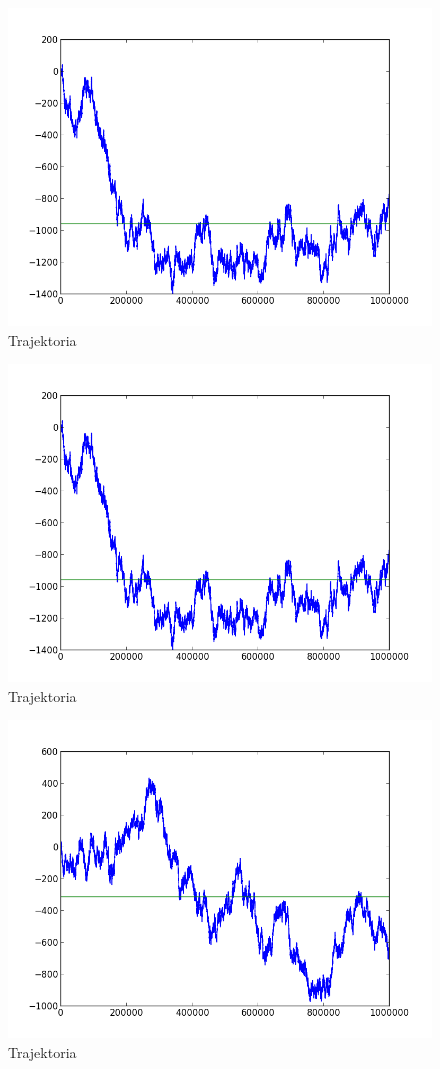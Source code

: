 \documentclass[a4paper, 12pt]{article}
\begin{document}
\begin{figure}[h]
\includegraphics[scale=0.5]{traj3.png}
\caption{Trajektoria}
\label{fig:tr3}
\end{figure}
\begin{figure}[h]
\includegraphics[scale=0.5]{traj3.png}
\caption{Trajektoria}
\label{fig:tr4}
\end{figure}
\begin{figure}[h]
\includegraphics[scale=0.5]{traj5.png}
\caption{Trajektoria}
\label{fig:tr5}
\end{figure}
\end{document}
